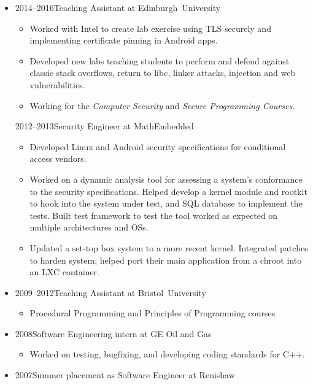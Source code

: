 \documentclass[a4paper,10pt,selectp]{book}
\newcommand{\lowercaps}[1]{\textsc{\MakeLowercase{#1}}}
\newcommand{\sideheading}[1]{\vspace{0.5em}\marginnote[\color{BrickRed}\raggedleft\lowercaps{#1}]{\raggedleft\lowercaps{#1}}}
\newcommand{\listhead}[1]{#1}
\begin{document}
\begin{itemize}
\item[] 
  \sideheading{Experience}%
  \listhead{2014--2016\hspace{1em}Teaching Assistant at Edinburgh~University}
  \begin{itemize}
  \item[] Worked with Intel to create lab exercise using TLS securely and implementing certificate pinning in Android apps.
  \item[] Developed new labs teaching students to perform and defend against classic stack
    overflows, return to libc, linker attacks, injection and web vulnerabilities.
  \item[] Working for the \emph{Computer Security} and \emph{Secure Programming Courses}.
  \end{itemize}
  \listhead{2012–2013\hspace{1em}Security Engineer at MathEmbedded}
  \begin{itemize}
  \item[] Developed Linux and Android security specifications for conditional access vendors.  
  \item[] Worked on a dynamic analysis tool for assessing a system's
    conformance to the security specifications.  Helped develop a
    kernel module and rootkit to hook into the system under test, and
    SQL database to implement the tests.  Built test framework to test the tool worked as expected on multiple architectures and OSs.
  \item[] Updated a set-top box system to a more recent kernel. Integrated patches to
    harden system; helped port their main application from a chroot into an LXC container.
  \end{itemize}

\item[] \listhead{2009–2012\hspace{1em}Teaching Assistant at
    Bristol~University}
    \begin{itemize}
    \item[] Procedural Programming and Principles of Programming courses
    \end{itemize}

\item[] \listhead{2008\hspace{1em}Software Engineering intern at GE Oil and Gas}
  \begin{itemize}
    \item[] Worked on testing, bugfixing, and developing coding standards for C++.
  \end{itemize}

\item[] \listhead{2007\hspace{1em}Summer placement as Software Engineer at Renishaw}
\end{itemize}
\end{document}
